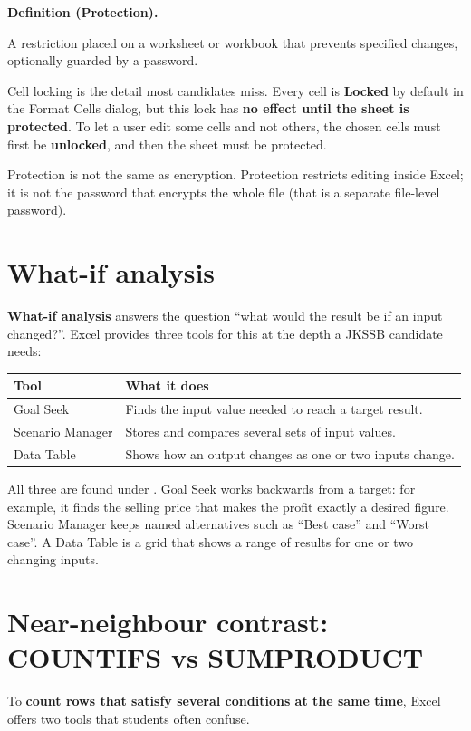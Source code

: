 \documentclass[11pt]{article}
\newenvironment{definitionbox}[1]{%
  \par\noindent\textbf{Definition (#1).}\ \itshape
}{\par\vspace{0.3em}}
\begin{document}
\begin{definitionbox}{Protection}
A restriction placed on a worksheet or workbook that prevents specified changes,
optionally guarded by a password.
\end{definitionbox}

Cell locking is the detail most candidates miss. Every cell is \textbf{Locked}
by default in the Format Cells dialog, but this lock has \textbf{no effect until
the sheet is protected}. To let a user edit some cells and not others, the
chosen cells must first be \textbf{unlocked}, and then the sheet must be
protected.

Protection is not the same as encryption. Protection restricts editing inside
Excel; it is not the password that encrypts the whole file (that is a separate
file-level password).

\section{What-if analysis}
\textbf{What-if analysis} answers the question ``what would the result be if an
input changed?''. Excel provides three tools for this at the depth a JKSSB
candidate needs:

\begin{center}
\begin{tabular}{p{}p{}}
\toprule
\textbf{Tool} & \textbf{What it does} \\
\midrule
Goal Seek & Finds the input value needed to reach a target result. \\
Scenario Manager & Stores and compares several sets of input values. \\
Data Table & Shows how an output changes as one or two inputs change. \\
\bottomrule
\end{tabular}
\end{center}

All three are found under . Goal Seek works
backwards from a target: for example, it finds the selling price that makes the
profit exactly a desired figure. Scenario Manager keeps named alternatives such
as ``Best case'' and ``Worst case''. A Data Table is a grid that shows a range
of results for one or two changing inputs.

\section{Near-neighbour contrast: COUNTIFS vs SUMPRODUCT}
To \textbf{count rows that satisfy several conditions at the same time}, Excel
offers two tools that students often confuse.
\end{document}
